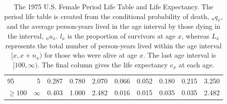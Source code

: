\documentclass[11pt,letterpaper]{article}
\theoremstyle{plain}
\begin{document}
\begin{table}[htbp]
\begin{tabular}{lrrrrrrrrr}
  95 & 5 & 0.287 & 0.780 & 2.070 & 0.066 & 0.052 & 0.180 & 0.215 & 3.250 \\ 
  $\geq100$ & $\infty$ & 0.403 & 1.000 & 2.482 & 0.016 & 0.015 & 0.035 & 0.035 & 2.482 \\ 
   \bottomrule
\end{tabular}
\caption{The 1975 U.S. Female Period Life Table and Life Expectancy.  
  The period life table is created from the conditional
  probability of death, $_nq_x$, and the average person-years lived
  in the age interval by those dying in the interval, $_na_x$.
  $l_x$ is the proportion of survivors at age $x$, whereas $L_x$
  represents the total number of person-years lived within the age
  interval $[x, x+n_x)$ for those who were alive at age $x$. The
  last age interval is $[100, \infty)$. The final column gives the
  life expectancy $e_x$ at each age.}
    \label{tb:lifetable}
\end{table}

\end{document}
